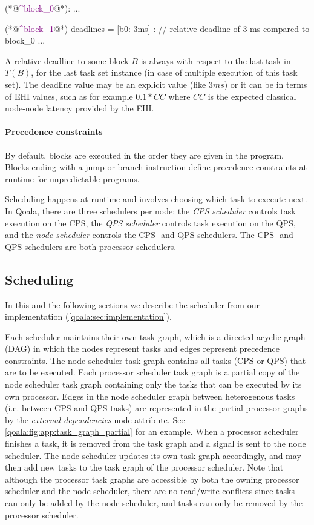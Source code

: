 \begin{qoalacode}[caption=Pseudocode for the Algorithm, label=lst:pseudocode]
(*@\textcolor{purple}{\textasciicircum block\_0}@*):
    ...

(*@\textcolor{purple}{\textasciicircum block\_1}@*) { deadlines = [b0: 3ms] }:  // relative deadline of 3 ms compared to block_0
    ...
\end{qoalacode}

A relative deadline to some block $B$ is always with respect to the last task in $T(B)$, for the last task set instance (in case of multiple execution of this task set).
The deadline value may be an explicit value (like $3 ms$) or it can be in terms of EHI values, such as for example $0.1 * CC$ where $CC$ is the expected classical node-node latency provided by the EHI.

\paragraph{Precedence constraints}
By default, blocks are executed in the order they are given in the program.
Blocks ending with a jump or branch instruction define precedence constraints at runtime for unpredictable programs.

Scheduling happens at runtime and involves choosing which task to execute next.
In Qoala, there are three schedulers per node: the \textit{CPS scheduler} controls task execution on the CPS,
the \textit{QPS scheduler} controls task execution on the QPS, and the \textit{node scheduler} controls the CPS- and QPS schedulers.
The CPS- and QPS schedulers are both processor schedulers.

\subsection{Scheduling}
In this and the following sections we describe the scheduler from our implementation (\cref{qoala:sec:implementation}).

Each scheduler maintains their own task graph,
which is a directed acyclic graph (DAG) in which the nodes represent tasks and edges represent precedence constraints.
The node scheduler task graph contains all tasks (CPS or QPS) that are to be executed.
Each processor scheduler task graph is a partial copy of the node scheduler task graph containing only the tasks that can be executed by its own processor.
Edges in the node scheduler graph between heterogenous tasks (i.e. between CPS and QPS tasks) are represented in the partial processor graphs by the \textit{external dependencies} node attribute. See \cref{qoala:fig:app:task_graph_partial} for an example.
When a processor scheduler finishes a task, it is removed from the task graph and a signal is sent to the node scheduler.
The node scheduler updates its own task graph accordingly, and may then add new tasks to the task graph of the processor scheduler.
Note that although the processor task graphs are accessible by both the owning processor scheduler and the node scheduler, there are no read/write conflicts
since tasks can only be added by the node scheduler, and tasks can only be removed by the processor scheduler.

